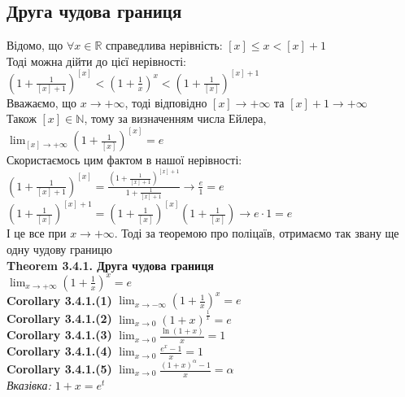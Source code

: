 \documentclass[a4paper, 14pt]{extarticle}
\def\huge{\displaystyle}
\def\bigline{\vspace{5mm}\\}
\def\th#1{\textbf{Theorem {#1}}}
\def\crl#1{\textbf{Corollary {#1}}}
\def\bigline{\vspace{5mm}\\}
\begin{document}
\subsection{Друга чудова границя}
Відомо, що $\forall x \in \mathbb{R}$ справедлива нерівність: $[x] \leq x < [x]+1$\\
Тоді можна дійти до цієї нерівності:\\
$\huge \left(1 + \frac{1}{[x]+1} \right)^{[x]} < \left(1 + \frac{1}{x} \right)^x < \left(1 + \frac{1}{[x]} \right)^{[x]+1}$\\
Вважаємо, що $x \to +\infty$, тоді відповідно $[x] \to + \infty$ та $[x]+1 \to + \infty$\\
Також $[x] \in \mathbb{N}$, тому за визначенням числа Ейлера,\\
$\huge \lim_{[x] \to +\infty} \left(1 + \frac{1}{[x]} \right)^{[x]} = e$\\
Скористаємось цим фактом в нашої нерівності:\\
$\huge \left(1 + \frac{1}{[x]+1} \right)^{[x]} = \frac{\huge \left(1 + \frac{1}{[x]+1} \right)^{[x]+1}}{\huge 1 + \frac{1}{[x]+1}} \to \frac{e}{1} = e$\\
$\huge \left(1 + \frac{1}{[x]} \right)^{[x]+1} = \left(1 + \frac{1}{[x]} \right)^{[x]} \left(1 + \frac{1}{[x]} \right) \to e \cdot 1 = e$\\
І це все при $x \to +\infty$. Тоді за теоремою про поліцаїв, отримаємо так звану ще одну чудову границю\\
\th{3.4.1. Друга чудова границя} \\ $\huge \lim_{x \to +\infty} \left(1 +\frac{1}{x} \right)^x = e$
\bigline
\crl{3.4.1.(1)} $\huge \lim_{x \to -\infty} \left(1 +\frac{1}{x} \right)^x = e$\\
\crl{3.4.1.(2)} $\huge \lim_{x \to 0} \left(1 +x \right)^{\textstyle \frac{1}{x}} = e$\\
\crl{3.4.1.(3)} $\huge \lim_{x \to 0} \frac{\ln(1+x)}{x} = 1$\\
\crl{3.4.1.(4)} $\huge \lim_{x \to 0} \frac{e^x - 1}{x} = 1$\\
\crl{3.4.1.(5)} $\huge \lim_{x \to 0} \frac{(1+x)^\alpha - 1}{x} = \alpha$\\
\textit{Вказівка: $1 + x = e^t$}\\
\end{document}
